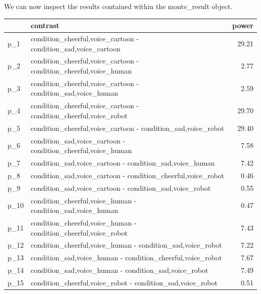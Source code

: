 \documentclass[
]{book}
\newenvironment{Shaded}{\begin{snugshade}}{\end{snugshade}}
\newcommand{\DecValTok}[1]{\textcolor[rgb]{0.00,0.00,0.81}{#1}}
\newcommand{\FunctionTok}[1]{\textcolor[rgb]{0.00,0.00,0.00}{#1}}
\newcommand{\NormalTok}[1]{#1}
\newcommand{\SpecialCharTok}[1]{\textcolor[rgb]{0.00,0.00,0.00}{#1}}
\begin{document}
We can now inspect the results contained within the monte\_result object.

\begin{Shaded}
\end{Shaded}

\begin{tabular}{l|l|r}
\hline
  & contrast & power\\
\hline
p\_1 & condition\_cheerful,voice\_cartoon - condition\_sad,voice\_cartoon & 29.21\\
\hline
p\_2 & condition\_cheerful,voice\_cartoon - condition\_cheerful,voice\_human & 2.77\\
\hline
p\_3 & condition\_cheerful,voice\_cartoon - condition\_sad,voice\_human & 2.59\\
\hline
p\_4 & condition\_cheerful,voice\_cartoon - condition\_cheerful,voice\_robot & 29.70\\
\hline
p\_5 & condition\_cheerful,voice\_cartoon - condition\_sad,voice\_robot & 29.40\\
\hline
p\_6 & condition\_sad,voice\_cartoon - condition\_cheerful,voice\_human & 7.58\\
\hline
p\_7 & condition\_sad,voice\_cartoon - condition\_sad,voice\_human & 7.42\\
\hline
p\_8 & condition\_sad,voice\_cartoon - condition\_cheerful,voice\_robot & 0.46\\
\hline
p\_9 & condition\_sad,voice\_cartoon - condition\_sad,voice\_robot & 0.55\\
\hline
p\_10 & condition\_cheerful,voice\_human - condition\_sad,voice\_human & 0.47\\
\hline
p\_11 & condition\_cheerful,voice\_human - condition\_cheerful,voice\_robot & 7.43\\
\hline
p\_12 & condition\_cheerful,voice\_human - condition\_sad,voice\_robot & 7.22\\
\hline
p\_13 & condition\_sad,voice\_human - condition\_cheerful,voice\_robot & 7.67\\
\hline
p\_14 & condition\_sad,voice\_human - condition\_sad,voice\_robot & 7.49\\
\hline
p\_15 & condition\_cheerful,voice\_robot - condition\_sad,voice\_robot & 0.51\\
\hline
\end{tabular}
\end{document}
